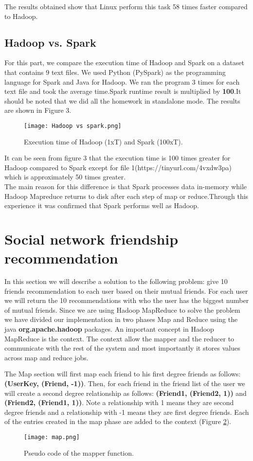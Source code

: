 \documentclass[12pt]{article}
\begin{document}
\noindent The results obtained show that Linux perform this task 58 times faster compared to Hadoop.

\subsection{Hadoop vs. Spark}
For this part, we compare the execution time of Hadoop and Spark on a dataset that contains 9 text files. We used Python (PySpark) as the programming language for Spark and Java for Hadoop. We ran the program 3 times for each text file and took the average time.Spark runtime result is multiplied by \textbf{100}.It should be noted that we did all the homework in standalone mode. The results are shown in Figure 3.

\begin{figure}[h]
  \centering
  \texttt{[image: Hadoop vs spark.png]}
  \caption{Execution time of Hadoop (1xT) and Spark (100xT).}
  \label{fig:hadoop vs spark}
\end{figure}
It can be seen from figure 3 that the execution time is 100 times greater for Hadoop compared to Spark except for file 1(https://tinyurl.com/4vxdw3pa) which is approximately 50 times greater.\\
The main reason for this difference is that Spark processes data in-memory while Hadoop Mapreduce returns to disk after each step of map or reduce.Through this experience it was confirmed that Spark performs well as Hadoop.
\section{Social network friendship recommendation}
In this section we will describe a solution to the following problem:
give 10 friends recommendation to each user based on their mutual friends.
For each user we will return the 10 recommendations with who the user has the biggest number of mutual friends. Since we are using Hadoop MapReduce to solve the problem we have divided our implementation in two phases Map and Reduce using the java \textbf{org.apache.hadoop} packages. An important concept in Hadoop MapReduce is the context. The context allow the mapper and the reducer to communicate with the rest of the system and most importantly it stores values across map and reduce jobs. 


The Map section will first map each friend to his first degree friends as follows: \textbf{(UserKey, (Friend, -1))}.
Then, for each friend in the friend list of the user we will create a second degree relationship as follows: \textbf{(Friend1, (Friend2, 1))} and \textbf{(Friend2, (Friend1, 1))}. Note a relationship with 1 means they are second degree friends and a relationship with -1 means they are first degree friends. Each of the entries created in the map phase are added to the context (Figure \ref{fig:map}).
\begin{figure}[h]
  \centering
  \texttt{[image: map.png]}
  \caption{Pseudo code of the mapper function.}
  \label{fig:map}
\end{figure}
\end{document}
